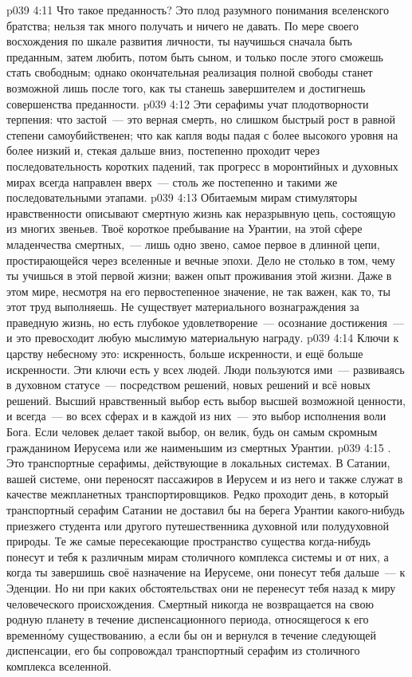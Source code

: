 \vs p039 4:11 Что такое преданность? Это плод разумного понимания вселенского братства; нельзя так много получать и ничего не давать. По мере своего восхождения по шкале развития личности, ты научишься сначала быть преданным, затем любить, потом быть сыном, и только после этого сможешь стать свободным; однако окончательная реализация полной свободы станет возможной лишь после того, как ты станешь завершителем и достигнешь совершенства преданности.
\vs p039 4:12 \pc Эти серафимы учат плодотворности терпения: что застой~--- это верная смерть, но слишком быстрый рост в равной степени самоубийственен; что как капля воды падая с более высокого уровня на более низкий и, стекая дальше вниз, постепенно проходит через последовательность коротких падений, так прогресс в моронтийных и духовных мирах всегда направлен вверх~--- столь же постепенно и такими же последовательными этапами.
\vs p039 4:13 Обитаемым мирам стимуляторы нравственности описывают смертную жизнь как неразрывную цепь, состоящую из многих звеньев. Твоё короткое пребывание на Урантии, на этой сфере младенчества смертных,~--- лишь одно звено, самое первое в длинной цепи, простирающейся через вселенные и вечные эпохи. Дело не столько в том, чему ты учишься в этой первой жизни; важен опыт проживания этой жизни. Даже  в этом мире, несмотря на его первостепенное значение, не так важен, как то,  ты этот труд выполняешь. Не существует материального вознаграждения за праведную жизнь, но есть глубокое удовлетворение~--- осознание достижения~--- и это превосходит любую мыслимую материальную награду.
\vs p039 4:14 Ключи к царству небесному это: искренность, больше искренности, и ещё больше искренности. Эти ключи есть у всех людей. Люди пользуются ими~--- развиваясь в духовном статусе~--- посредством решений, новых решений и всё новых решений. Высший нравственный выбор есть выбор высшей возможной ценности, и всегда~--- во всех сферах и в каждой из них~--- это выбор исполнения воли Бога. Если человек делает такой выбор, он  велик, будь он самым скромным гражданином Иерусема или же наименьшим из смертных Урантии.
\vs p039 4:15 . Это транспортные серафимы, действующие в локальных системах. В Сатании, вашей системе, они переносят пассажиров в Иерусем и из него и также служат в качестве межпланетных транспортировщиков. Редко проходит день, в который транспортный серафим Сатании не доставил бы на берега Урантии какого\hyp{}нибудь приезжего студента или другого путешественника духовной или полудуховной природы. Те же самые пересекающие пространство существа когда\hyp{}нибудь понесут и тебя к различным мирам столичного комплекса системы и от них, а когда ты завершишь своё назначение на Иерусеме, они понесут тебя дальше~--- к Эденции. Но ни при каких обстоятельствах они не перенесут тебя назад к миру человеческого происхождения. Смертный никогда не возвращается на свою родную планету в течение диспенсационного периода, относящегося к его временн\'ому существованию, а если бы он и вернулся в течение следующей диспенсации, его бы сопровождал транспортный серафим из столичного комплекса вселенной.
